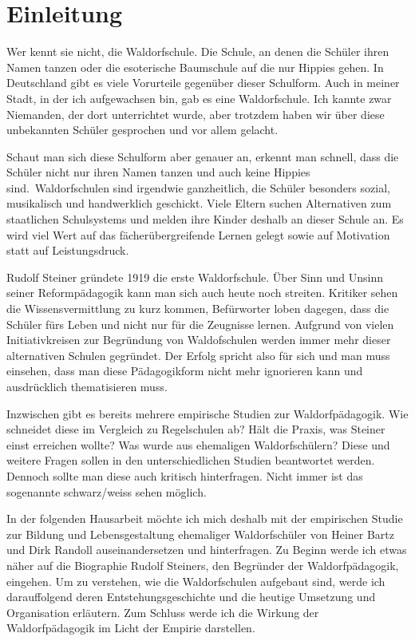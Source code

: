 \section{Einleitung}

Wer kennt sie nicht, die Waldorfschule. Die Schule, an denen die Schüler ihren Namen tanzen oder die esoterische Baumschule auf die nur Hippies gehen. In Deutschland gibt es viele Vorurteile gegenüber dieser Schulform. Auch in meiner Stadt, in der ich aufgewachsen bin, gab es eine Waldorfschule. Ich kannte zwar Niemanden, der dort unterrichtet wurde, aber trotzdem haben wir über diese unbekannten Schüler gesprochen und vor allem gelacht. 

Schaut man sich diese Schulform aber genauer an, erkennt man schnell, dass die Schüler nicht nur ihren Namen tanzen und auch keine Hippies sind. Waldorfschulen sind irgendwie ganzheitlich, die Schüler besonders sozial, musikalisch und handwerklich geschickt. Viele Eltern suchen Alternativen zum staatlichen Schulsystems und melden ihre Kinder deshalb an dieser Schule an. Es wird viel Wert auf das fächerübergreifende Lernen gelegt sowie auf Motivation statt auf Leistungsdruck. 

Rudolf Steiner gründete 1919 die erste Waldorfschule. Über Sinn und Unsinn seiner Reformpädagogik kann man sich auch heute noch streiten. Kritiker sehen die Wissensvermittlung zu kurz kommen, Befürworter loben dagegen, dass die Schüler fürs Leben und nicht nur für die Zeugnisse lernen. Aufgrund von vielen Initiativkreisen zur Begründung von Waldofschulen werden immer mehr dieser alternativen Schulen gegründet. Der Erfolg spricht also für sich und man muss einsehen, dass man diese Pädagogikform nicht mehr ignorieren kann und ausdrücklich thematisieren muss. 

Inzwischen gibt es bereits mehrere empirische Studien zur Waldorfpädagogik. Wie schneidet diese im Vergleich zu Regelschulen ab? Hält die Praxis, was Steiner einst erreichen wollte? Was wurde aus ehemaligen Waldorfschülern? Diese und weitere Fragen sollen in den unterschiedlichen Studien beantwortet werden. Dennoch sollte man diese auch kritisch hinterfragen. Nicht immer ist das sogenannte schwarz/weiss sehen möglich. 

In der folgenden Hausarbeit möchte ich mich deshalb mit der empirischen Studie zur Bildung und Lebensgestaltung ehemaliger Waldorfschüler von Heiner Bartz und Dirk Randoll auseinandersetzen und hinterfragen. Zu Beginn werde ich etwas näher auf die Biographie Rudolf Steiners, den Begründer der Waldorfpädagogik, eingehen. Um zu verstehen, wie die Waldorfschulen aufgebaut sind, werde ich darauffolgend deren Entstehungsgeschichte und die heutige Umsetzung und Organisation erläutern. Zum Schluss werde ich die Wirkung der Waldorfpädagogik im Licht der Empirie darstellen.